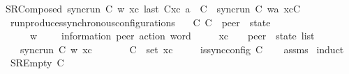 \begin{isabellebody}
SRComposed{\isacharcolon}{\kern0pt}\ {\isachardoublequoteopen}{\isasymlbrakk}sync{\isacharunderscore}{\kern0pt}run\ C{}\ w\ xc{\isacharsemicolon}{\kern0pt}\ last\ {\isacharparenleft}{\kern0pt}C{}{\isacharhash}{\kern0pt}xc{\isacharparenright}{\kern0pt}\ {\isasymmidarrow}{\isasymlangle}a{\isacharcomma}{\kern0pt}\ {\isasymzero}{\isasymrangle}{\isasymrightarrow}\ C{\isasymrbrakk}\ {\isasymLongrightarrow}\ sync{\isacharunderscore}{\kern0pt}run\ C{}\ {\isacharparenleft}{\kern0pt}w{\isasymcdot}{\isacharbrackleft}{\kern0pt}a{\isacharbrackright}{\kern0pt}{\isacharparenright}{\kern0pt}\ {\isacharparenleft}{\kern0pt}xc{\isacharat}{\kern0pt}{\isacharbrackleft}{\kern0pt}C{\isacharbrackright}{\kern0pt}{\isacharparenright}{\kern0pt}{\isachardoublequoteclose}\isanewline
\isanewline
{}\isamarkupfalse%
\ run{\isacharunderscore}{\kern0pt}produces{\isacharunderscore}{\kern0pt}synchronous{\isacharunderscore}{\kern0pt}configurations{\isacharcolon}{\kern0pt}\isanewline
\ \ \ C\ C{\isacharprime}{\kern0pt}\ {\isacharcolon}{\kern0pt}{\isacharcolon}{\kern0pt}\ {\isachardoublequoteopen}{\isacharprime}{\kern0pt}peer\ {\isasymRightarrow}\ {\isacharprime}{\kern0pt}state{\isachardoublequoteclose}\isanewline
\ \ \ \ \ w\ \ \ \ {\isacharcolon}{\kern0pt}{\isacharcolon}{\kern0pt}\ {\isachardoublequoteopen}{\isacharparenleft}{\kern0pt}{\isacharprime}{\kern0pt}information{\isacharcomma}{\kern0pt}\ {\isacharprime}{\kern0pt}peer{\isacharparenright}{\kern0pt}\ action\ word{\isachardoublequoteclose}\isanewline
\ \ \ \ \ xc\ \ \ {\isacharcolon}{\kern0pt}{\isacharcolon}{\kern0pt}\ {\isachardoublequoteopen}{\isacharparenleft}{\kern0pt}{\isacharprime}{\kern0pt}peer\ {\isasymRightarrow}\ {\isacharprime}{\kern0pt}state{\isacharparenright}{\kern0pt}\ list{\isachardoublequoteclose}\isanewline
\ \ \ {\isachardoublequoteopen}sync{\isacharunderscore}{\kern0pt}run\ C\ w\ xc{\isachardoublequoteclose}\isanewline
\ \ \ \ \ \ \ {\isachardoublequoteopen}C{\isacharprime}{\kern0pt}\ {\isasymin}\ set\ xc{\isachardoublequoteclose}\isanewline
\ \ \ \ \ {\isachardoublequoteopen}is{\isacharunderscore}{\kern0pt}sync{\isacharunderscore}{\kern0pt}config\ C{\isacharprime}{\kern0pt}{\isachardoublequoteclose}\isanewline
%
\isadelimproof
\ \ %
\endisadelimproof
%
\isatagproof
{}\isamarkupfalse%
\ assms\isanewline
{}\isamarkupfalse%
\ induct\isanewline
\ \ \isamarkupfalse%
\ {\isacharparenleft}{\kern0pt}SREmpty\ C{\isacharparenright}{\kern0pt}\isanewline

\end{isabellebody}

